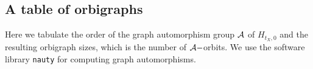 %
\subsection{A table of orbigraphs}\label{OrbigraphTable}

Here we tabulate the order of the graph automorphism group $\mathcal{A}$ of $H_{t_X,0}$
and the resulting orbigraph sizes, which is the number of $\mathcal{A}-$orbits.
We use the software library {\tt nauty}\cite{McKay2014} for computing graph automorphisms.



